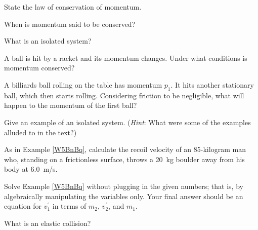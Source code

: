 \documentclass[main.tex]{subfiles}
\begin{document}

\begin{exercise}
    State the law of conservation of momentum.
\end{exercise}

\begin{exercise}
    When is momentum said to be conserved?
\end{exercise}

\begin{exercise}
    What is an isolated system?
\end{exercise}

\begin{exercise}
    A ball is hit by a racket and its momentum changes. Under what conditions is momentum conserved?
\end{exercise}


\begin{exercise} \label{yEzMEO}
    A billiards ball rolling on the table has momentum $p_1$. It hits another stationary ball, which then starts rolling. Considering friction to be negligible, what will happen to the momentum of the first ball?
\end{exercise}

\begin{exercise}
    Give an example of an isolated system. (\textit{Hint}: What were some of the examples alluded to in the text?)
\end{exercise}

\begin{exercise} \label{Fl5xyW}
    As in Example \ref{W5BnBq}, calculate the recoil velocity of an 85-kilogram man who, standing on a frictionless surface, throws a \SI{20}{kg} boulder away from his body at \SI{6.0}{m/s}.
\end{exercise}

\begin{exercise} \label{dMW612}
    Solve Example \ref{W5BnBq} without plugging in the given numbers; that is, by algebraically manipulating the variables only. Your final answer should be an equation for $v_1^{\prime}$ in terms of $m_2$, $v_2^{\prime}$, and $m_1$.
\end{exercise}


\begin{exercise} \label{rhrGbz}
    What is an elastic collision?
\end{exercise}

\end{document}
